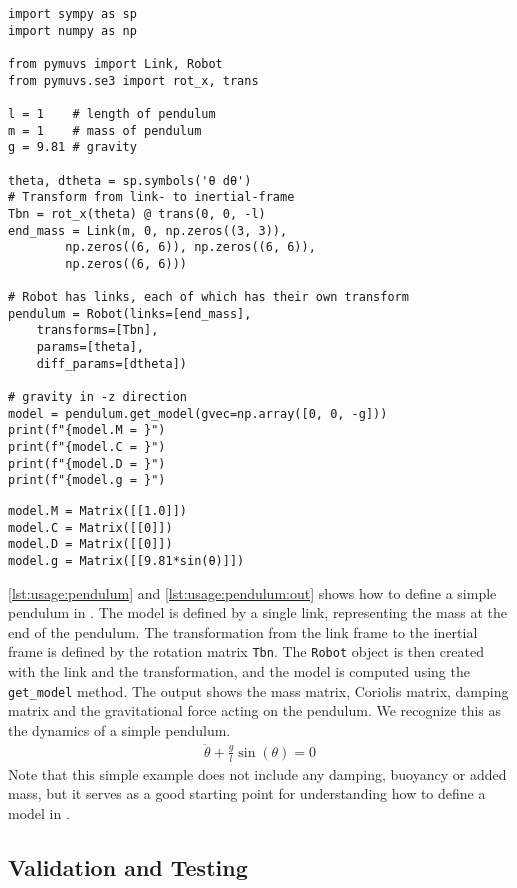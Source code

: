 \begin{lstlisting}[style=custompython,
    caption={Dynamic model of a simple pendulum in \pymuvs{}.},
    label={lst:usage:pendulum}]
import sympy as sp
import numpy as np

from pymuvs import Link, Robot
from pymuvs.se3 import rot_x, trans

l = 1    # length of pendulum
m = 1    # mass of pendulum
g = 9.81 # gravity

theta, dtheta = sp.symbols('θ dθ')
# Transform from link- to inertial-frame
Tbn = rot_x(theta) @ trans(0, 0, -l)
end_mass = Link(m, 0, np.zeros((3, 3)),
        np.zeros((6, 6)), np.zeros((6, 6)),
        np.zeros((6, 6)))

# Robot has links, each of which has their own transform
pendulum = Robot(links=[end_mass],
    transforms=[Tbn],
    params=[theta],
    diff_params=[dtheta])

# gravity in -z direction
model = pendulum.get_model(gvec=np.array([0, 0, -g]))
print(f"{model.M = }")
print(f"{model.C = }")
print(f"{model.D = }")
print(f"{model.g = }")
\end{lstlisting}
\begin{lstlisting}[style=customtxt,
    caption={Output of \autoref{lst:usage:pendulum}.},
    label={lst:usage:pendulum:out}]
model.M = Matrix([[1.0]])
model.C = Matrix([[0]])
model.D = Matrix([[0]])
model.g = Matrix([[9.81*sin(θ)]])
\end{lstlisting}
\autoref{lst:usage:pendulum} and \autoref{lst:usage:pendulum:out} shows how to define a simple pendulum
in \pymuvs{}. The model is defined by a single link, representing the mass at the
end of the pendulum. The transformation from the link frame to the inertial frame
is defined by the rotation matrix \texttt{Tbn}. The \texttt{Robot} object is then
created with the link and the transformation, and the model is computed using the
\texttt{get\_model} method. The output shows the mass matrix, Coriolis matrix, damping
matrix and the gravitational force acting on the pendulum. We recognize this
as the dynamics of a simple pendulum.
\begin{align}
    \ddot{\theta} + \frac{g}{l} \sin(\theta) = 0
\end{align}
Note that this simple example does not include any damping, buoyancy or added mass,
but it serves as a good starting point for understanding how to define a model in
\pymuvs{}.

\subsection{Validation and Testing}

